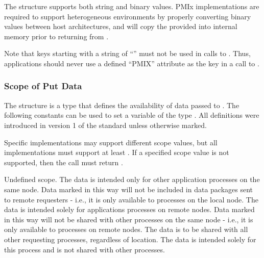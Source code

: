 The  structure supports both string and binary values.
\ac{PMIx} implementations are required to support heterogeneous environments by properly converting binary values between host architectures, and will copy the provided  into internal memory prior to returning from .

\adviceuserstart
Note that keys starting with a string of ``'' must not be used in calls to . Thus, applications should never use a defined ``PMIX'' attribute as the key in a call to .
\adviceuserend


\subsubsection{Scope of Put Data}

The  structure is a  type that defines the availability of data passed to .
The following constants can be used to set a variable of the type . All definitions were introduced in version 1 of the standard unless otherwise marked.

Specific implementations may support different scope values, but all implementations must support at least .
If a specified scope value is not supported, then the  call must return .

\begin{constantdesc}
%
Undefined scope.
%
The data is intended only for other application processes on the same node.
Data marked in this way will not be included in data packages sent to remote requesters - i.e., it is only available to processes on the local node.
%
The data is intended solely for applications processes on remote nodes.
Data marked in this way will not be shared with other processes on the same node - i.e., it is only available to  processes on remote nodes.
%
The data is to be shared with all other requesting processes, regardless of location.
%
The data is intended solely for this process and is not shared with other processes.
%
\end{constantdesc}


